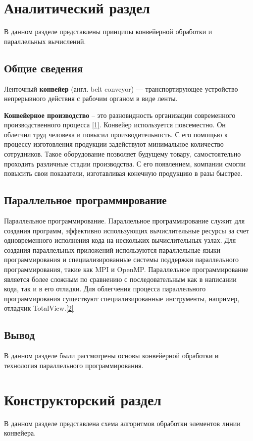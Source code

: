 \documentclass[14pt, a4paper]{extarticle}
\begin{document}
\clearpage
\section{Аналитический раздел}
В данном разделе представлены принципы конвейерной обработки и параллельных вычислений.
\subsection{Общие сведения}
Ленточный \textbf{конвейер} (англ. belt conveyor) — транспортирующее устройство непрерывного действия с рабочим органом в виде ленты. \par
\textbf{Конвейерное производство} – это разновидность организации современного производственного процесса \hyperref[literature]{[1]}. Конвейер используется повсеместно. Он облегчил труд человека и повысил производительность. С его помощью к процессу изготовления продукции задействуют минимальное количество сотрудников. Такое оборудование позволяет будущему товару, самостоятельно проходить различные стадии производства. С его появлением, компании смогли повысить свои показатели, изготавливая конечную продукцию в разы быстрее.
\subsection{Параллельное программирование}
Параллельное программирование. Параллельное программирование служит для создания программ, эффективно использующих вычислительные ресурсы за счет одновременного исполнения кода на нескольких вычислительных узлах. Для создания параллельных приложений используются параллельные языки программирования и специализированные системы поддержки параллельного программирования, такие как MPI и OpenMP. Параллельное программирование является более сложным по сравнению с последовательным как в написании кода, так и в его отладки. Для облегчения процесса параллельного программирования существуют специализированные инструменты, например, отладчик TotalView.\hyperref[literature]{[2]}
\subsection{Вывод}
В данном разделе были рассмотрены основы конвейерной обработки и технология параллельного программирования.
\clearpage
\section{Конструкторский раздел}
В данном разделе представлена схема алгоритмов обработки элементов линии конвейера.
\end{document}
